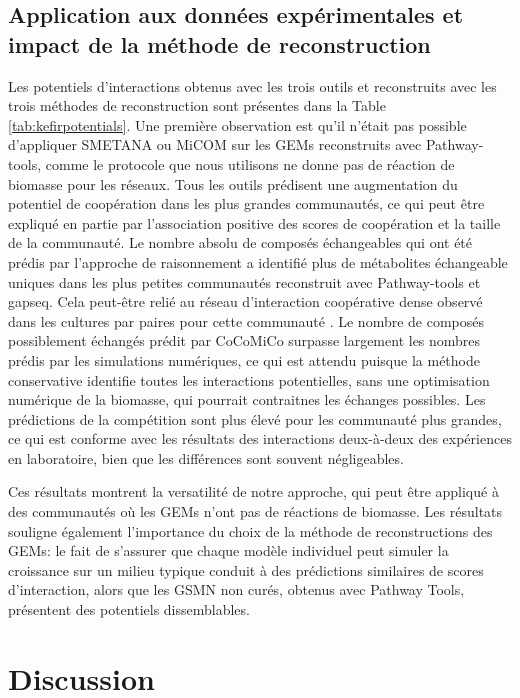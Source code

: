 \subsection{Application aux données expérimentales et impact de la méthode de reconstruction} 
Les potentiels d'interactions obtenus avec les trois outils et reconstruits avec les trois méthodes de reconstruction sont présentes dans la Table \ref{tab:kefirpotentials}. Une première observation est qu'il n'était pas possible d'appliquer SMETANA ou MiCOM sur les GEMs reconstruits avec Pathway-tools, comme le protocole que nous utilisons ne donne pas de réaction de biomasse pour les réseaux. Tous les outils prédisent une augmentation du potentiel de coopération dans les plus grandes communautés, ce qui peut être expliqué en partie par l'association positive des scores de coopération et la taille de la communauté. Le nombre absolu de composés échangeables qui ont été prédis par l'approche de raisonnement a identifié plus de métabolites échangeable uniques dans les plus petites communautés reconstruit avec Pathway-tools et gapseq. Cela peut-être relié au réseau d'interaction coopérative dense observé dans les cultures par paires pour cette communauté \citep{Blasche.2021}. Le nombre de composés possiblement échangés prédit par CoCoMiCo surpasse largement les nombres prédis par les simulations numériques, ce qui est attendu puisque la méthode conservative identifie toutes les interactions potentielles, sans une optimisation numérique de la biomasse, qui pourrait contraitnes les échanges possibles. Les prédictions de la compétition sont plus élevé pour les communauté plus grandes, ce qui est conforme avec les résultats des interactions deux-à-deux des expériences en laboratoire, bien que les différences sont souvent négligeables.

Ces résultats montrent la versatilité de notre approche, qui peut être appliqué à des communautés où les GEMs n'ont pas de réactions de biomasse. Les résultats souligne également l'importance du choix de la méthode de reconstructions des GEMs: le fait de s'assurer que chaque modèle individuel peut simuler la croissance sur un milieu typique conduit à des prédictions similaires de scores d'interaction, alors que les GSMN non curés, obtenus avec Pathway Tools, présentent des potentiels dissemblables.


\section{Discussion}

